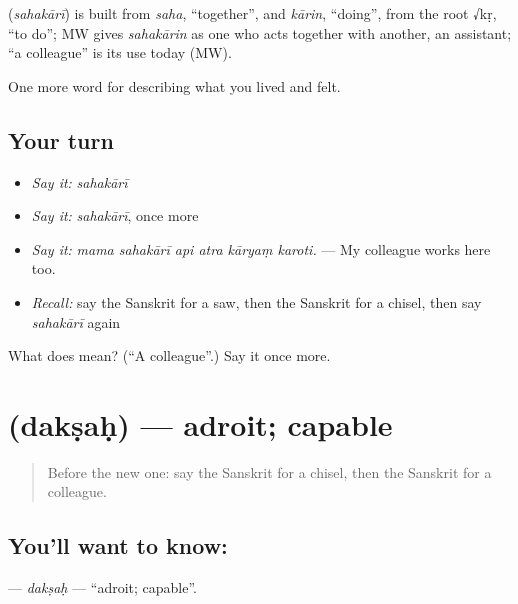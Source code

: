 \begin{cousinweb}
\textbf{} (\emph{sahakārī}) is built from \emph{saha}, \textquotedblleft{}together\textquotedblright{}, and \emph{kārin}, \textquotedblleft{}doing\textquotedblright{}, from the root √kṛ, \textquotedblleft{}to do\textquotedblright{}; MW gives \emph{sahakārin} as one who acts together with another, an assistant; \textquotedblleft{}a colleague\textquotedblright{} is its use today (MW).
\end{cousinweb}

\begin{grammarlens}[title={What you've built}]
One more word for describing what you lived and felt.
\end{grammarlens}

\subsection*{Your turn}
\begin{itemize}
\raggedright
  \item \emph{Say it:} \emph{sahakārī}
  \item \emph{Say it:} \emph{sahakārī}, once more
  \item \emph{Say it:} \emph{mama sahakārī api atra kāryaṃ karoti.} — My colleague works here too.
  \item \emph{Recall:} say the Sanskrit for a saw, then the Sanskrit for a chisel, then say \emph{sahakārī} again
\end{itemize}

\begin{tcolorbox}[breakable,colback=teal!4,colframe=teal!35!black,title={Before you move on}]
What does  mean? (\textquotedblleft{}A colleague\textquotedblright{}.) Say it once more.
\end{tcolorbox}
\section[\texorpdfstring{\sk{दक्षः} (dakṣaḥ)}{दक्षः (dakṣaḥ)}]{ (dakṣaḥ) — adroit; capable}

\label{lesson:SA-C503-daksah}



\begin{quote}
Before the new one: say the Sanskrit for a chisel, then the Sanskrit for a colleague.
\end{quote}

\subsection*{You'll want to know: }
\textbf{} — \emph{dakṣaḥ} — \textquotedblleft{}adroit; capable\textquotedblright{}.


